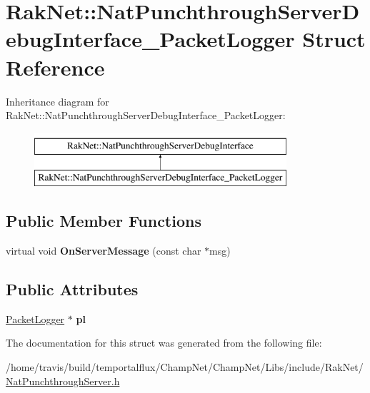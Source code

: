 \hypertarget{struct_rak_net_1_1_nat_punchthrough_server_debug_interface___packet_logger}{\section{Rak\-Net\-:\-:Nat\-Punchthrough\-Server\-Debug\-Interface\-\_\-\-Packet\-Logger Struct Reference}
\label{struct_rak_net_1_1_nat_punchthrough_server_debug_interface___packet_logger}
}
Inheritance diagram for Rak\-Net\-:\-:Nat\-Punchthrough\-Server\-Debug\-Interface\-\_\-\-Packet\-Logger\-:\begin{figure}[H]
\begin{center}
\leavevmode
\includegraphics[height=2.000000cm]{struct_rak_net_1_1_nat_punchthrough_server_debug_interface___packet_logger}
\end{center}
\end{figure}
\subsection*{Public Member Functions}
\begin{DoxyCompactItemize}
\item 
\hypertarget{struct_rak_net_1_1_nat_punchthrough_server_debug_interface___packet_logger_a757f3c907f6b379c08f986d9f75683d9}{virtual void {\bfseries On\-Server\-Message} (const char $\ast$msg)}\label{struct_rak_net_1_1_nat_punchthrough_server_debug_interface___packet_logger_a757f3c907f6b379c08f986d9f75683d9}

\end{DoxyCompactItemize}
\subsection*{Public Attributes}
\begin{DoxyCompactItemize}
\item 
\hypertarget{struct_rak_net_1_1_nat_punchthrough_server_debug_interface___packet_logger_a41edd4f579e578d38ae838ec9c141518}{\hyperlink{class_rak_net_1_1_packet_logger}{Packet\-Logger} $\ast$ {\bfseries pl}}\label{struct_rak_net_1_1_nat_punchthrough_server_debug_interface___packet_logger_a41edd4f579e578d38ae838ec9c141518}

\end{DoxyCompactItemize}


The documentation for this struct was generated from the following file\-:\begin{DoxyCompactItemize}
\item 
/home/travis/build/temportalflux/\-Champ\-Net/\-Champ\-Net/\-Libs/include/\-Rak\-Net/\hyperlink{_nat_punchthrough_server_8h}{Nat\-Punchthrough\-Server.\-h}\end{DoxyCompactItemize}
